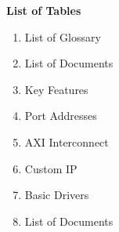 \documentclass{report}
\begin{document}
\vspace{10mm}
\textbf{\Large List of Tables}
\vspace{3mm}
\begin{enumerate}[ align=right, itemsep=5pt] %
  \item List of Glossary 
  \item List of Documents 
  \item Key Features 
  \item Port Addresses 
  \item AXI Interconnect 
  \item Custom IP 
  \item Basic Drivers 
  \item List of Documents 
\end{enumerate}















\end{document}
